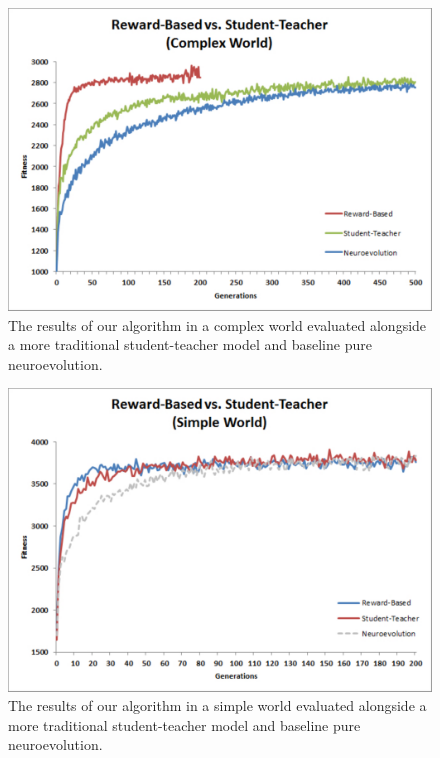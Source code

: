 \documentclass{acm_proc_article-sp}
\begin{document}
\begin{figure}
  \centering
    \includegraphics[scale=.35]{complex_reward_based_vs_student_teacher.pdf}
  \caption{The results of our algorithm in a complex world evaluated alongside a more traditional student-teacher model and baseline pure neuroevolution.}
  \label{fig:reward-studetteacher}
\end{figure}
\begin{figure}
  \centering
    \includegraphics[scale=.35]{simple_reward_based_vs_student_teacher.pdf}
  \caption{The results of our algorithm in a simple world evaluated alongside a more traditional student-teacher model and baseline pure neuroevolution.}
  \label{fig:reward-studetteacher}
\end{figure}
\end{document}

